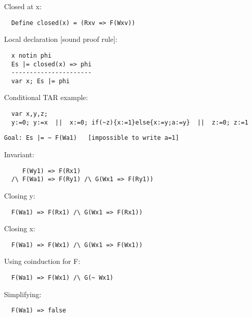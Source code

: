 Closed at x:
\begin{verbatim}
  Define closed(x) = (Rxv => F(Wxv))
\end{verbatim}
Local declaration [sound proof rule]:
\begin{verbatim}
  x notin phi
  Es |= closed(x) => phi
  ----------------------
  var x; Es |= phi
\end{verbatim}
Conditional TAR example:
\begin{verbatim}
  var x,y,z;
  y:=0; y:=x  ||  x:=0; if(~z){x:=1}else{x:=y;a:=y}  ||  z:=0; z:=1
\end{verbatim}
\begin{verbatim}
Goal: Es |= ~ F(Wa1)   [impossible to write a=1]
\end{verbatim}
Invariant:
\begin{verbatim}
     F(Wy1) => F(Rx1)
  /\ F(Wa1) => F(Ry1) /\ G(Wx1 => F(Ry1))
\end{verbatim}
Closing y:
\begin{verbatim}
  F(Wa1) => F(Rx1) /\ G(Wx1 => F(Rx1))
\end{verbatim}
Closing x:
\begin{verbatim}
  F(Wa1) => F(Wx1) /\ G(Wx1 => F(Wx1))
\end{verbatim}
Using coinduction for F:  
\begin{verbatim}
  F(Wa1) => F(Wx1) /\ G(~ Wx1)
\end{verbatim}
Simplifying:  
\begin{verbatim}
  F(Wa1) => false
\end{verbatim}